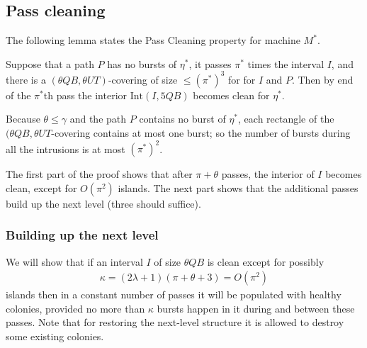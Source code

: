 \documentclass[11pt]{memoir}
\theoremstyle{definition} %
\renewcommand{\le}{\leq}
\def\B{B}
\def\U{U}
\newcommand{\Int}{\mathrm{Int}}
\newcommand{\passno}{\pi}
\newcommand{\Q}{Q}
\newcommand{\Tu}{T}
\newcommand{\Z}{Z}
\begin{document}
\subsection{Pass cleaning}

The following lemma states the Pass Cleaning property for machine \( M^{*} \).  

\begin{lemma}
Suppose that a path \( P \) has no bursts of \( \eta^{*} \), it passes \( \pi^{*} \) times
the interval \( I \),
and there is a \( (\theta \Q\B, \theta\U\Tu) \)-covering of size \( \le (\pi^{*})^{3} \) for
for \( I \) and \( P \).
Then by end of the \( \pi ^{*} \)th pass the interior
\( \Int(I, 5\Q\B) \) becomes clean for \( \eta^{*} \).
\end{lemma}

Because \( \theta\le\gamma \) and the path \( P \) contains no burst of \( \eta^{*} \),
each rectangle of the \( (\theta \Q\B, \theta\U\Tu \)-covering contains at most one burst;
so the number of bursts during all the intrusions is at most \( (\passno^{*})^{2} \).




The first part of the proof shows that after \( \passno+\theta \) passes, the interior of \( I \) becomes
clean, except for \( O(\passno^{2}) \) islands.
The next part shows that the additional passes build up the next level (three should suffice).

\subsubsection{Building up the next level}

We will show that if an interval \( I \) of size \( \theta \Q\B \) is clean except for
possibly 
\begin{align}\label{eq:islands-bd}
  \kappa=(2\lambda+1)(\passno+\theta+3)=O(\passno^{2}) 
\end{align}
islands then in a constant number of passes it will be populated with healthy colonies, provided
no more than \( \kappa \) bursts happen in it during and between these passes.
Note that for restoring the next-level structure it is allowed to destroy some existing colonies.

\end{document}
